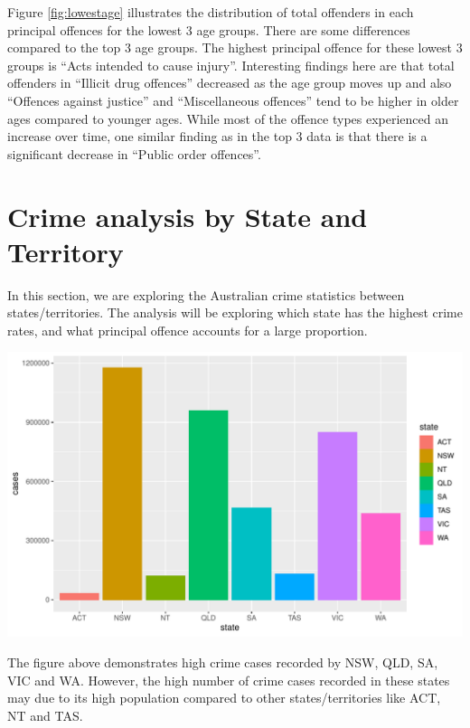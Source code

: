 \documentclass[11pt,a4paper,]{article}
\let\origfigure\figure
\let\endorigfigure\endfigure
\renewenvironment{figure}[1][2] {
\expandafter\origfigure\expandafter[H]
} {
\endorigfigure
}
\begin{document}
Figure \ref{fig:lowestage} illustrates the distribution of total offenders in each principal offences for the lowest 3 age groups. There are some differences compared to the top 3 age groups. The highest principal offence for these lowest 3 groups is ``Acts intended to cause injury''. Interesting findings here are that total offenders in ``Illicit drug offences'' decreased as the age group moves up and also ``Offences against justice'' and ``Miscellaneous offences'' tend to be higher in older ages compared to younger ages. While most of the offence types experienced an increase over time, one similar finding as in the top 3 data is that there is a significant decrease in ``Public order offences''.

\pagebreak

\section*{Crime analysis by State and Territory}

In this section, we are exploring the Australian crime statistics between states/territories. The analysis will be exploring which state has the highest crime rates, and what principal offence accounts for a large proportion.

\begin{figure}
\centering
\includegraphics{ETC5513-Assignment4_files/figure-latex/graph1-1.pdf}
\caption{\label{fig:graph1}state-crime}
\end{figure}

The figure above demonstrates high crime cases recorded by NSW, QLD, SA, VIC and WA. However, the high number of crime cases recorded in these states may due to its high population compared to other states/territories like ACT, NT and TAS.
\end{document}
